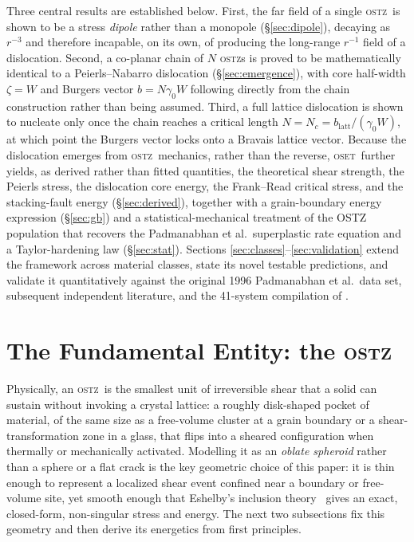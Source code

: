 \documentclass[3p]{elsarticle}
\newcommand{\OSTZ}{\textsc{ostz}}
\newcommand{\OSET}{\textsc{oset}}
\newcommand{\gz}{\gamma_0}
\begin{document}
Three central results are established below. First, the far field of
a single \OSTZ\ is shown to be a stress \emph{dipole} rather than a
monopole (\S\ref{sec:dipole}), decaying as $r^{-3}$ and therefore
incapable, on its own, of producing the long-range $r^{-1}$ field of a
dislocation. Second, a co-planar chain of $N$ \OSTZ s is proved to be
mathematically identical to a Peierls--Nabarro dislocation
(\S\ref{sec:emergence}), with core half-width $\zeta=W$ and Burgers
vector $b=N\gz W$ following directly from the chain construction
rather than being assumed. Third, a full lattice dislocation is shown
to nucleate only once the chain reaches a critical length
$N=N_c=b_\mathrm{latt}/(\gz W)$, at which point the Burgers vector
locks onto a Bravais lattice vector. Because the dislocation emerges
from \OSTZ\ mechanics, rather than the reverse, \OSET\ further yields,
as derived rather than fitted quantities, the theoretical shear
strength, the Peierls stress, the dislocation core energy, the
Frank--Read critical stress, and the stacking-fault energy
(\S\ref{sec:derived}), together with a grain-boundary energy
expression (\S\ref{sec:gb}) and a statistical-mechanical treatment of
the OSTZ population that recovers the Padmanabhan et al.\ superplastic
rate equation and a Taylor-hardening law (\S\ref{sec:stat}). Sections
\ref{sec:classes}--\ref{sec:validation} extend the framework across
material classes, state its novel testable predictions, and validate
it quantitatively against the original 1996 Padmanabhan et al.\ data
set, subsequent independent literature, and the 41-system compilation
of \citet{harisankar2025}.

\section{The Fundamental Entity: the \OSTZ}
\label{sec:ostz}

Physically, an \OSTZ\ is the smallest unit of irreversible shear
that a solid can sustain without invoking a crystal lattice: a
roughly disk-shaped pocket of material, of the same size as a
free-volume cluster at a grain boundary or a shear-transformation
zone in a glass, that flips into a sheared configuration when
thermally or mechanically activated. Modelling it as an
\emph{oblate spheroid} rather than a sphere or a flat crack is the
key geometric choice of this paper: it is thin enough to represent a
localized shear event confined near a boundary or free-volume site,
yet smooth enough that Eshelby's inclusion theory~\citep{eshelby1957}
gives an exact, closed-form, non-singular stress and energy. The
next two subsections fix this geometry and then derive its
energetics from first principles.
\end{document}
